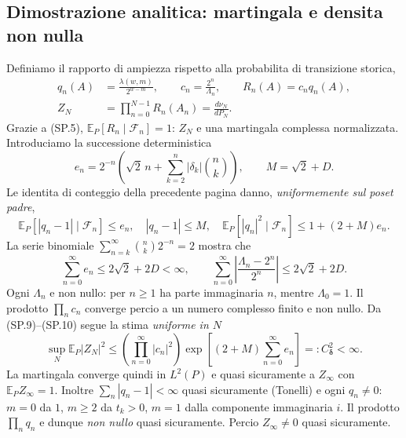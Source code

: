 \documentclass[11pt,a4paper]{article}
\begin{document}
\subsection*{Dimostrazione analitica: martingala e densita non nulla}
Definiamo il rapporto di ampiezza rispetto alla probabilita di transizione storica,
\begin{align}
q_n(A)&=\frac{\lambda(w,m)}{2^{w-m}},\qquad
c_n=\frac{2^n}{\Lambda_n},\qquad R_n(A)=c_nq_n(A),\tag{SP.6}\\
Z_N&=\prod_{n=0}^{N-1}R_n(A_n)=\frac{d\nu_N}{dP_N}.\tag{SP.7}
\end{align}
Grazie a (SP.5), $\mathbb E_P[R_n\mid\mathcal F_n]=1$: $Z_N$ e una martingala complessa normalizzata. Introduciamo la successione deterministica
\begin{equation}
e_n=2^{-n}\left(\sqrt2\,n+\sum_{k=2}^{n}|\delta_k|\binom nk\right),
\qquad M=\sqrt2+D.\tag{SP.8}
\end{equation}
Le identita di conteggio della precedente pagina danno, \emph{uniformemente sul poset padre},
\begin{equation}
\mathbb E_P[|q_n-1|\mid\mathcal F_n]\le e_n,\quad
|q_n-1|\le M,\quad
\mathbb E_P[|q_n|^2\mid\mathcal F_n]\le1+(2+M)e_n.\tag{SP.9}
\end{equation}
La serie binomiale $\sum_{n=k}^{\infty}\binom nk2^{-n}=2$ mostra che
\begin{equation}
\boxed{\ \sum_{n=0}^{\infty}e_n\le2\sqrt2+2D<\infty,\qquad
\sum_{n=0}^{\infty}\left|\frac{\Lambda_n-2^n}{2^n}\right|\le2\sqrt2+2D.\ }
\tag{SP.10}
\end{equation}
Ogni $\Lambda_n$ e non nullo: per $n\ge1$ ha parte immaginaria $n$, mentre $\Lambda_0=1$. Il prodotto $\prod_nc_n$ converge percio a un numero complesso finito e non nullo. Da (SP.9)--(SP.10) segue la stima \emph{uniforme in $N$}
\begin{equation}
\boxed{\ \sup_N\mathbb E_P|Z_N|^2\le
\left(\prod_{n=0}^{\infty}|c_n|^2\right)
\exp\left[(2+M)\sum_{n=0}^{\infty}e_n\right]
=:C_{\boldsymbol\delta}^2<\infty.\ }
\tag{SP.11}
\end{equation}
La martingala converge quindi in $L^2(P)$ e quasi sicuramente a $Z_\infty$ con $\mathbb E_PZ_\infty=1$. Inoltre $\sum_n|q_n-1|<\infty$ quasi sicuramente (Tonelli) e ogni $q_n\ne0$: $m=0$ da $1$, $m\ge2$ da $t_k>0$, $m=1$ dalla componente immaginaria $i$. Il prodotto $\prod_nq_n$ e dunque \emph{non nullo} quasi sicuramente. Percio $Z_\infty\ne0$ quasi sicuramente.

\clearpage
\end{document}
